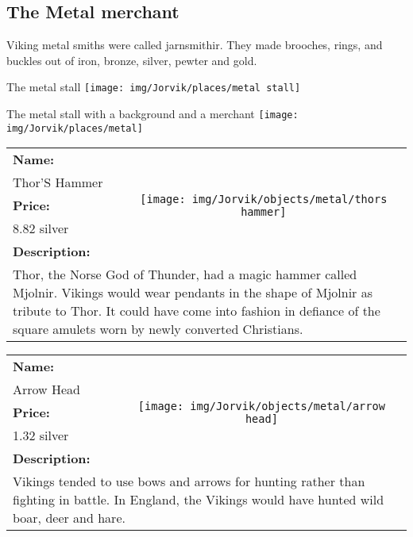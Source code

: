 

\clearpage
\subsection{The Metal merchant}
\label{sec:appendix:moj:metal}

Viking metal smiths were called jarnsmithir. They made brooches, rings, and buckles out of iron, bronze, silver, pewter and gold.

\begin{display}{The metal stall}
	\label{fig:appendix:moj:places:metal:stall}
	\texttt{[image: img/Jorvik/places/metal stall]}
\end{display}

\begin{display}{The metal stall with a background and a merchant}
	\label{fig:appendix:moj:places:metal}
	\texttt{[image: img/Jorvik/places/metal]}
\end{display}
\clearpage


\begin{table}[ht!]
	\centering
	\begin{tabular}{ p{3cm} c }\toprule
		\textbf{Name:} & \multirow{5}{*}{\texttt{[image: img/Jorvik/objects/metal/thors hammer]}}\\
		Thor'S Hammer & \\ 
		\textbf{Price:} & \\
		8.82 silver & \\ 
		\textbf{Description:} & \\
		\multicolumn{2}{p{12cm}}{Thor, the Norse God of Thunder, had a magic hammer called Mjolnir. Vikings would wear pendants in the shape of Mjolnir as tribute to Thor. It could have come into fashion in defiance of the square amulets worn by newly converted Christians.}\\
		\bottomrule
	\end{tabular}
\end{table}

\begin{table}[ht!]
	\centering
	\begin{tabular}{ p{3cm} c }\toprule
		\textbf{Name:} & \multirow{5}{*}{\texttt{[image: img/Jorvik/objects/metal/arrow head]}}\\
		Arrow Head & \\ 
		\textbf{Price:} & \\
		1.32 silver & \\ 
		\textbf{Description:} & \\
		\multicolumn{2}{p{12cm}}{Vikings tended to use bows and arrows for hunting rather than fighting in battle. In England, the Vikings would have hunted wild boar, deer and hare.}\\
		\bottomrule
	\end{tabular}
\end{table}

